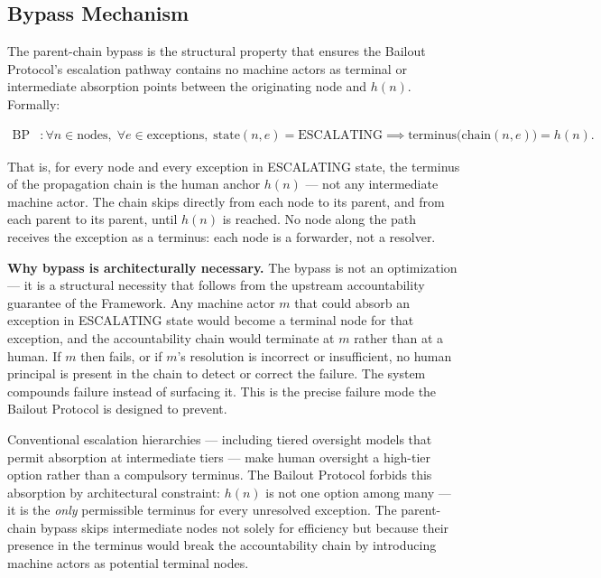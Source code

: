 \subsection{Bypass Mechanism}\label{sec:bypass}

The parent-chain bypass is the structural property that ensures the Bailout Protocol's escalation pathway contains no machine actors as terminal or intermediate absorption points between the originating node and $h(n)$. Formally:

\begin{align}
\text{BP} &: \forall n \in \text{nodes},\; \forall e \in \text{exceptions},\; \text{state}(n, e) = \text{ESCALATING} \implies \text{terminus}\bigl(\text{chain}(n, e)\bigr) = h(n). \tag{BP}
\end{align}

That is, for every node and every exception in ESCALATING state, the terminus of the propagation chain is the human anchor $h(n)$ — not any intermediate machine actor. The chain skips directly from each node to its parent, and from each parent to its parent, until $h(n)$ is reached. No node along the path receives the exception as a terminus: each node is a forwarder, not a resolver.

\bigskip
\noindent\textbf{Why bypass is architecturally necessary.} The bypass is not an optimization — it is a structural necessity that follows from the upstream accountability guarantee of the \bxthree{} Framework. Any machine actor $m$ that could absorb an exception in ESCALATING state would become a terminal node for that exception, and the accountability chain would terminate at $m$ rather than at a human. If $m$ then fails, or if $m$'s resolution is incorrect or insufficient, no human principal is present in the chain to detect or correct the failure. The system compounds failure instead of surfacing it. This is the precise failure mode the Bailout Protocol is designed to prevent.

Conventional escalation hierarchies — including tiered oversight models that permit absorption at intermediate tiers — make human oversight a high-tier option rather than a compulsory terminus. The Bailout Protocol forbids this absorption by architectural constraint: $h(n)$ is not one option among many — it is the \emph{only} permissible terminus for every unresolved exception. The parent-chain bypass skips intermediate nodes not solely for efficiency but because their presence in the terminus would break the accountability chain by introducing machine actors as potential terminal nodes.


